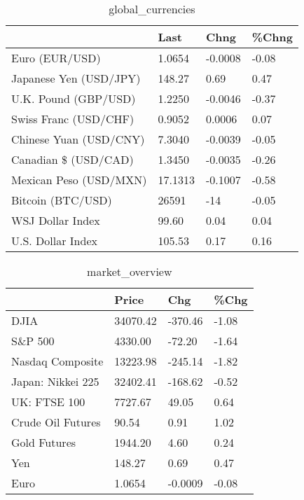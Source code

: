 \documentclass{article}%
\begin{document}
%


\begin{table}[htbp]%
\caption{global\_currencies}%
\centering%
\begin{adjustbox}{width=1\textwidth}%
\begin{tabular}{llll}
\toprule
                       &    Last &    Chng & \%Chng \\
\midrule
        Euro (EUR/USD) &  1.0654 & -0.0008 & -0.08 \\
Japanese Yen (USD/JPY) &  148.27 &    0.69 &  0.47 \\
  U.K. Pound (GBP/USD) &  1.2250 & -0.0046 & -0.37 \\
 Swiss Franc (USD/CHF) &  0.9052 &  0.0006 &  0.07 \\
Chinese Yuan (USD/CNY) &  7.3040 & -0.0039 & -0.05 \\
  Canadian \$ (USD/CAD) &  1.3450 & -0.0035 & -0.26 \\
Mexican Peso (USD/MXN) & 17.1313 & -0.1007 & -0.58 \\
     Bitcoin (BTC/USD) &   26591 &     -14 & -0.05 \\
      WSJ Dollar Index &   99.60 &    0.04 &  0.04 \\
     U.S. Dollar Index &  105.53 &    0.17 &  0.16 \\
\bottomrule
\end{tabular}
%
\end{adjustbox}%
\end{table}

%


\begin{table}[htbp]%
\caption{market\_overview}%
\centering%
\begin{adjustbox}{width=1\textwidth}%
\begin{tabular}{llll}
\toprule
                  &    Price &     Chg &  \%Chg \\
\midrule
             DJIA & 34070.42 & -370.46 & -1.08 \\
          S\&P 500 &  4330.00 &  -72.20 & -1.64 \\
 Nasdaq Composite & 13223.98 & -245.14 & -1.82 \\
Japan: Nikkei 225 & 32402.41 & -168.62 & -0.52 \\
     UK: FTSE 100 &  7727.67 &   49.05 &  0.64 \\
Crude Oil Futures &    90.54 &    0.91 &  1.02 \\
     Gold Futures &  1944.20 &    4.60 &  0.24 \\
              Yen &   148.27 &    0.69 &  0.47 \\
             Euro &   1.0654 & -0.0009 & -0.08 \\
\bottomrule
\end{tabular}
%
\end{adjustbox}%
\end{table}

%
\end{document}
